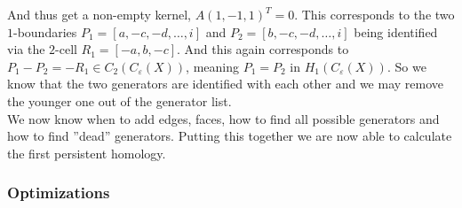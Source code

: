 \documentclass[11pt, a4paper, UKenglish]{article}
\begin{document}
    And thus get a non-empty kernel, $A(1,-1,1)^T=0$.
    This corresponds to the two $1$-boundaries $P_1=[a,-c,-d,\ldots,i]$ and $P_2=[b,-c,-d,\ldots,i]$ being identified via the $2$-cell $R_1=[-a,b,-c]$.
    And this again corresponds to $P_1-P_2=-R_1\in C_2(C_\varepsilon(X))$, meaning $P_1 = P_2$ in $H_1(C_\varepsilon(X))$.
    So we know that the two generators are identified with each other and we may remove the younger one out of the generator list.\\
    We now know when to add edges, faces, how to find all possible generators and how to find ''dead'' generators.
    Putting this together we are now able to calculate the first persistent homology.

    \subsubsection{Optimizations}\label{subsec:optimizations}
\end{document}
